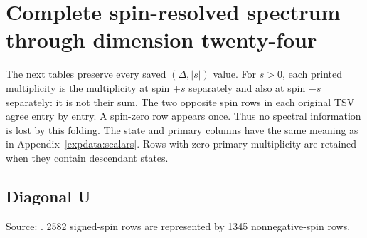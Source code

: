 \section{Complete spin-resolved spectrum through dimension twenty-four}
\label{expdata:spins}
The next tables preserve every saved $(\Delta,|s|)$ value. For $s>0$,
each printed multiplicity is the multiplicity at spin $+s$ separately
and also at spin $-s$ separately: it is not their sum. The two opposite
spin rows in each original TSV agree entry by entry. A spin-zero row
appears once. Thus no spectral information is lost by this folding.
The state and primary columns have the same meaning as in
Appendix~\ref{expdata:scalars}. Rows with zero primary multiplicity are
retained when they contain descendant states.
\subsection{Diagonal U}
Source: . 2582 signed-spin rows are represented by 1345 nonnegative-spin rows.

